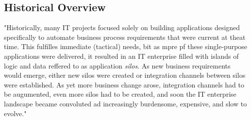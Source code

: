 \documentclass[12pt]{article}
\begin{document}
\subsection{Historical Overview}
"Historically, many IT projects focused solely on building applications designed specifically to automate business process requirements that were current at theat time. This fulfilles immediate (tactical) needs, bit as mpre pf these single-purpose applications were delivered, it resulted in an IT enterprise filled with islands of logic and data reffered to as application \textit{silos}. As new business requirements would emerge, either new silos were created or integration channels between silos were established. As yet more business change arose, integration channels had to be augumented, even more silos had to be created, and soon the IT enterprise landscape became convoluted ad increasingly burdensome, expensive, and slow to evolve."\cite[page 522]{grau} 
\end{document}
